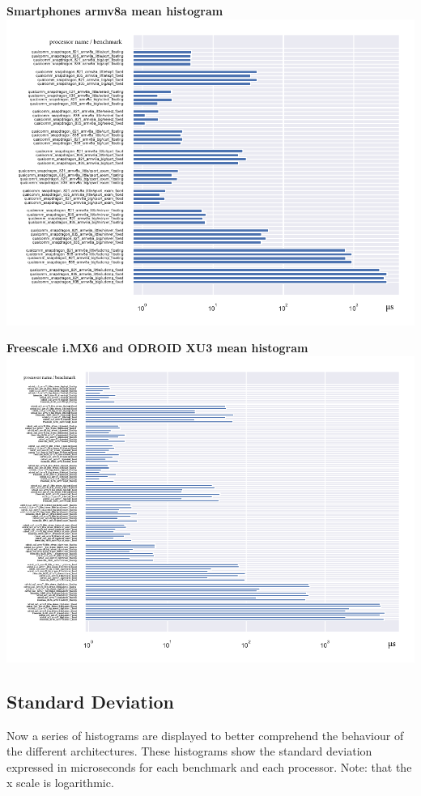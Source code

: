 \textbf{Smartphones armv8a mean histogram}\newline
\hspace*{-3.2cm}
\includegraphics[width=570pt]{smartphones_mean_histogram.pdf}
\clearpage

\textbf{Freescale i.MX6 and ODROID XU3 mean histogram}\newline
\hspace*{-3.2cm}
\includegraphics[width=570pt]{boards_mean_histogram.pdf}
\clearpage




\subsection{Standard Deviation}
Now a series of histograms are displayed to better comprehend the behaviour of the different architectures.
These histograms show the standard deviation expressed in microseconds for each benchmark and each processor.\newline
Note: that the x scale is logarithmic.\newline

